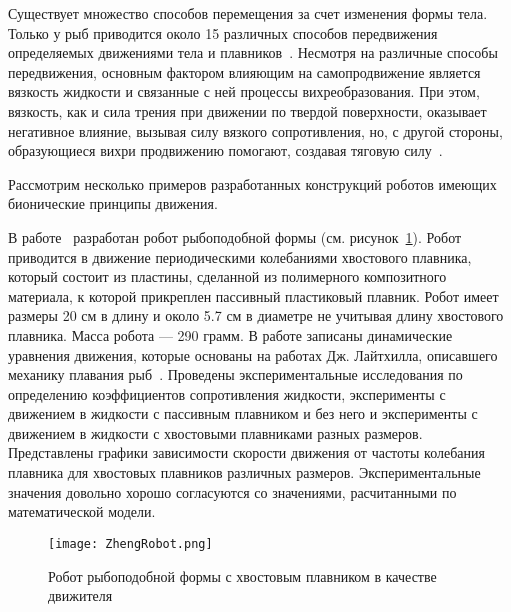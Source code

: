 Существует множество способов перемещения за счет изменения формы тела. Только у рыб приводится около 15 различных способов передвижения определяемых движениями тела и плавников~\cite{Blake_1983}. Несмотря на различные способы передвижения, основным фактором влияющим на самопродвижение является вязкость жидкости и связанные с ней процессы вихреобразования. При этом, вязкость, как и сила трения при движении по твердой поверхности, оказывает негативное влияние, вызывая силу вязкого сопротивления, но, с другой стороны, образующиеся вихри продвижению помогают, создавая тяговую силу~\cite{Vetchanin_Kilin_2016}.

Рассмотрим несколько примеров разработанных конструкций роботов имеющих бионические принципы движения.

В работе~\cite{Zheng_2010} разработан робот рыбоподобной формы (см. рисунок~\ref{ZhengRobot}). Робот приводится в движение периодическими колебаниями хвостового плавника, который состоит из пластины, сделанной из полимерного композитного материала, к которой прикреплен пассивный пластиковый плавник. Робот имеет размеры 20 см в длину и около 5.7 см в диаметре не учитывая длину хвостового плавника. Масса робота --- 290 грамм. В работе записаны динамические уравнения движения, которые основаны на работах Дж. Лайтхилла, описавшего механику плавания рыб~\cite{Lighthill_1970}. Проведены экспериментальные исследования по определению коэффициентов сопротивления жидкости, эксперименты с движением в жидкости с пассивным плавником и без него и эксперименты с движением в жидкости с хвостовыми плавниками разных размеров. Представлены графики зависимости скорости движения от частоты колебания плавника для хвостовых плавников различных размеров. Экспериментальные значения довольно хорошо согласуются со значениями, расчитанными по математической модели.

\begin{figure}[h]
	\centering
	\texttt{[image: ZhengRobot.png]}%
	\caption{Робот рыбоподобной формы с хвостовым плавником в качестве движителя}
	\label{ZhengRobot}
\end{figure}

